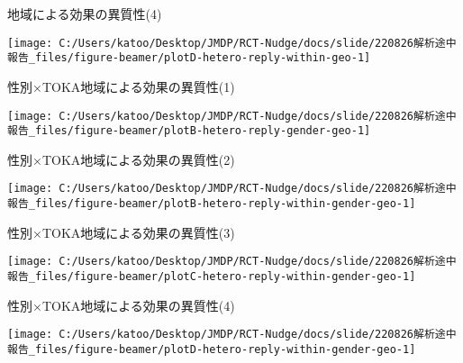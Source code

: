 \documentclass[
      aspectratio=169,
        12pt,
    ]{beamer}
\begin{document}
\begin{frame}{地域による効果の異質性(4)}
\protect\hypertarget{ux5730ux57dfux306bux3088ux308bux52b9ux679cux306eux7570ux8ceaux60274}{}
\begin{center}\texttt{[image: C:/Users/katoo/Desktop/JMDP/RCT-Nudge/docs/slide/220826解析途中報告\_files/figure-beamer/plotD-hetero-reply-within-geo-1]} \end{center}
\end{frame}

\begin{frame}{性別×TOKA地域による効果の異質性(1)}
\protect\hypertarget{ux6027ux5225tokaux5730ux57dfux306bux3088ux308bux52b9ux679cux306eux7570ux8ceaux60271}{}
\begin{center}\texttt{[image: C:/Users/katoo/Desktop/JMDP/RCT-Nudge/docs/slide/220826解析途中報告\_files/figure-beamer/plotB-hetero-reply-gender-geo-1]} \end{center}
\end{frame}

\begin{frame}{性別×TOKA地域による効果の異質性(2)}
\protect\hypertarget{ux6027ux5225tokaux5730ux57dfux306bux3088ux308bux52b9ux679cux306eux7570ux8ceaux60272}{}
\begin{center}\texttt{[image: C:/Users/katoo/Desktop/JMDP/RCT-Nudge/docs/slide/220826解析途中報告\_files/figure-beamer/plotB-hetero-reply-within-gender-geo-1]} \end{center}
\end{frame}

\begin{frame}{性別×TOKA地域による効果の異質性(3)}
\protect\hypertarget{ux6027ux5225tokaux5730ux57dfux306bux3088ux308bux52b9ux679cux306eux7570ux8ceaux60273}{}
\begin{center}\texttt{[image: C:/Users/katoo/Desktop/JMDP/RCT-Nudge/docs/slide/220826解析途中報告\_files/figure-beamer/plotC-hetero-reply-within-gender-geo-1]} \end{center}
\end{frame}

\begin{frame}{性別×TOKA地域による効果の異質性(4)}
\protect\hypertarget{ux6027ux5225tokaux5730ux57dfux306bux3088ux308bux52b9ux679cux306eux7570ux8ceaux60274}{}
\begin{center}\texttt{[image: C:/Users/katoo/Desktop/JMDP/RCT-Nudge/docs/slide/220826解析途中報告\_files/figure-beamer/plotD-hetero-reply-within-gender-geo-1]} \end{center}
\end{frame}
\end{document}
